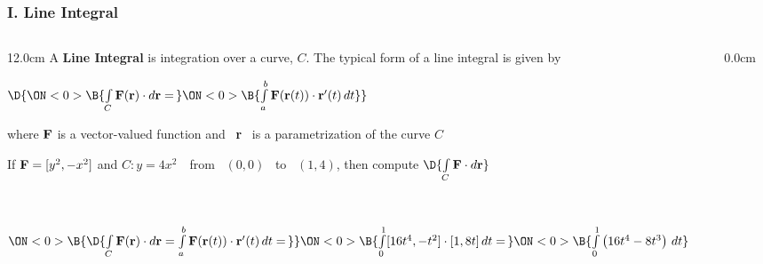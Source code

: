 \begin{frame}
\frametitle{I. Line Integral}
\scriptsize
\begin{columns}
\begin{column}{12.0cm}
\DEF A {\bf Line Integral} is integration over a curve, $C$.  The typical form of a line integral is given by
	
\begin{center}
$\D{ \ON<0>{\B{\int \limits_{C} {\bf F}({\bf r}) \cdot d{\bf r} =\,}} \ON<0>{\B{\int \limits_{a}^{b} {\bf F}({\bf r}(t)) \cdot {\bf r}'(t) \, dt}}}$	
\end{center}

where ${\bf F}$ is a vector-valued function and \, {\bf r} \, is a parametrization of the curve $C$

\vspace{0.2cm}

\EX If ${\bf F} = [y^2,-x^2]$ and $C: y = 4x^2$ \,\, from \, $(0,0)$ \, to \, $(1,4)$, then compute $\D{ \int \limits_{C} {\bf F} \cdot d{\bf r}}$

\SOL 
{}  \quad  
{} \quad 
{}

\vspace{0.2cm}

 \quad 
{} \,\, 

\vspace{0.2cm}

 \quad 
{} \quad 
{}

\vspace{0.2cm}

$\ON<0>{\B{\D{\int \limits_{C} {\bf F}({\bf r}) \cdot d{\bf r} = \int \limits_{a}^{b} {\bf F}({\bf r}(t)) \cdot {\bf r}'(t) \, dt =\,}} 
\ON<0>{\B{\int \limits_{0}^{1}[16t^4,-t^2] \cdot [1,8t] \, dt = \,}}
\ON<0>{\B{\int \limits_{0}^{1} \left( 16t^4 - 8t^3 \right) \, dt}}}$

\vspace{0.2cm}

\hspace{6.7cm} 

\vspace{0.2cm}

\hspace{6.7cm}

\end{column}
\begin{column}{0.0cm}\end{column}
\end{columns}
\end{frame}


